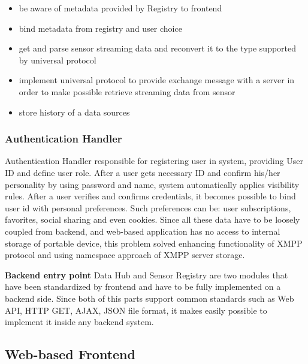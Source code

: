     \begin{itemize}
    \item be aware of metadata provided by Registry to frontend
    \item bind metadata from registry and user choice
    \item get and parse sensor streaming data and reconvert it to the type supported by universal protocol
    \item implement universal protocol to provide exchange message with a server in order to make possible retrieve streaming data from sensor
    \item store history of a data sources
    \end{itemize}

    \subsubsection{Authentication Handler}
    Authentication Handler responsible for registering user in system, providing User ID and define user role. After a user gets necessary ID and confirm his/her personality by using password and name, system automatically applies visibility rules. After a user verifies and confirms credentials, it becomes possible to bind user id with personal preferences. Such preferences can be: user subscriptions, favorites, social sharing and even cookies. Since all these data have to be loosely coupled from backend, and web-based application has no access to internal storage of portable device, this problem solved enhancing functionality of XMPP protocol and using namespace approach of XMPP server storage.

    \textbf{Backend entry point}
    Data Hub and Sensor Registry are two modules that have been standardized by frontend and have to be fully implemented on a backend side. Since both of this parts support common standards such as Web API, HTTP GET, AJAX, JSON file format, it makes easily possible to implement it inside any backend system.

  \subsection{Web-based Frontend}
